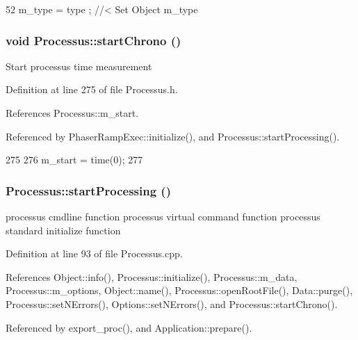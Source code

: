 \begin{DoxyCode}
52 { m_type  = type  ; } //< Set Object m_type
\end{DoxyCode}
\hypertarget{classProcessus_a5e4d34b86241fa0756e07375a14ff4b2}{
\subsubsection[{startChrono}]{\setlength{\rightskip}{0pt plus 5cm}void Processus::startChrono ()}}
\label{classProcessus_a5e4d34b86241fa0756e07375a14ff4b2}
Start processus time measurement 

Definition at line 275 of file Processus.h.

References Processus::m\_\-start.

Referenced by PhaserRampExec::initialize(), and Processus::startProcessing().


\begin{DoxyCode}
275                     {
276     m_start = time(0);
277   }
\end{DoxyCode}
\hypertarget{classProcessus_a09319bde9bed93e290f69b4e04585543}{
\subsubsection[{startProcessing}]{ Processus::startProcessing ()}}
\label{classProcessus_a09319bde9bed93e290f69b4e04585543}
processus cmdline function processus virtual command function processus standard initialize function 

Definition at line 93 of file Processus.cpp.

References Object::info(), Processus::initialize(), Processus::m\_\-data, Processus::m\_\-options, Object::name(), Processus::openRootFile(), Data::purge(), Processus::setNErrors(), Options::setNErrors(), and Processus::startChrono().

Referenced by export\_\-proc(), and Application::prepare().


